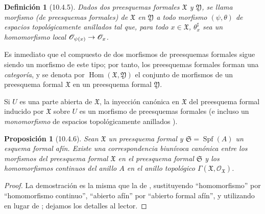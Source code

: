 \documentclass[oneside]{amsart}
\theoremstyle{ega-env-style}
\theoremstyle{ega-thm-env-style}
\newtheorem*{proposition}{Proposición}
\theoremstyle{ega-defn-env-style}
\newtheorem*{definition}{Definición}
\renewcommand{\to}{\mathchoice{\longrightarrow}{\rightarrow}{\rightarrow}{\rightarrow}}
\newcommand{\oldpage}[2][]{{\marginnote{\normalfont{\textbf{#1}~|~#2}}}\ignorespaces}
\let\EGAOriginalLabel\label
\renewcommand{\label}[1]{\phantomsection\EGAOriginalLabel{#1}}
\begin{document}
\begin{definition}[10.4.5]
\label{I.10.4.5}
Dados dos preesquemas formales $\mathfrak{X}$ y $\mathfrak{Y}$, se llama morfismo (de preesquemas formales) de $\mathfrak{X}$ en $\mathfrak{Y}$ a todo morfismo $(\psi,\theta)$ de espacios topológicamente anillados tal que, para todo $x\in\mathfrak{X}$, $\theta_x^\sharp$ sea un homomorfismo local $\mathscr{O}_{\psi(x)}\to\mathscr{O}_x$.
\end{definition}

Es inmediato que el compuesto de dos morfismos de preesquemas formales sigue siendo un morfismo de este tipo; por tanto, los preesquemas formales forman una \emph{categoría}, y se denota por $\operatorname{Hom}(\mathfrak{X},\mathfrak{Y})$ el conjunto de morfismos de un preesquema formal $\mathfrak{X}$ en un preesquema formal $\mathfrak{Y}$.

\oldpage[I]{186}
Si $U$ es una parte abierta de $\mathfrak{X}$, la inyección canónica en $\mathfrak{X}$ del preesquema formal inducido por $\mathfrak{X}$ sobre $U$ es un morfismo de preesquemas formales (e incluso un \emph{monomorfismo} de espacios topológicamente anillados ).

\begin{proposition}[10.4.6]
\label{I.10.4.6}
Sean $\mathfrak{X}$ un preesquema formal y $\mathfrak{S}=\operatorname{Spf}(A)$ un esquema formal afín.
Existe una correspondencia biunívoca canónica entre los morfismos del preesquema formal $\mathfrak{X}$ en el preesquema formal $\mathfrak{S}$ y los homomorfismos continuos del anillo $A$ en el anillo topológico $\Gamma(\mathfrak{X},\mathscr{O}_{\mathfrak{X}})$.
\end{proposition}

\begin{proof}
La demostración es la misma que la de , sustituyendo ``homomorfismo'' por ``homomorfismo continuo'', ``abierto afín'' por ``abierto formal afín'', y utilizando  en lugar de ; dejamos los detalles al lector.
\end{proof}
\end{document}
